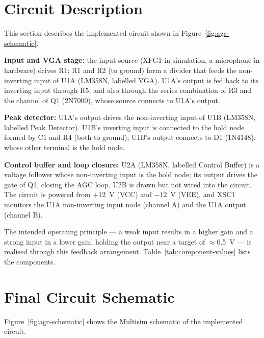 \section{Circuit Description}
\label{sec:circuit-description}

This section describes the implemented circuit shown in Figure~\ref{fig:agc-schematic}.

\textbf{Input and VGA stage:} the input source (XFG1 in simulation, a microphone in hardware) drives R1; R1 and R2 (to ground) form a divider that feeds the non-inverting input of U1A (LM358N, labelled VGA). U1A's output is fed back to its inverting input through R5, and also through the series combination of R3 and the channel of Q1 (2N7000), whose source connects to U1A's output.

\textbf{Peak detector:} U1A's output drives the non-inverting input of U1B (LM358N, labelled Peak Detector). U1B's inverting input is connected to the hold node formed by C1 and R4 (both to ground); U1B's output connects to D1 (1N4148), whose other terminal is the hold node.

\textbf{Control buffer and loop closure:} U2A (LM358N, labelled Control Buffer) is a voltage follower whose non-inverting input is the hold node; its output drives the gate of Q1, closing the AGC loop. U2B is drawn but not wired into the circuit. The circuit is powered from $+12$~V (VCC) and $-12$~V (VEE), and XSC1 monitors the U1A non-inverting input node (channel A) and the U1A output (channel B).

The intended operating principle --- a weak input results in a higher gain and a strong input in a lower gain, holding the output near a target of $\approx$0.5~V --- is realised through this feedback arrangement. Table~\ref{tab:component-values} lists the components.


\section{Final Circuit Schematic}

Figure~\ref{fig:agc-schematic} shows the Multisim schematic of the implemented circuit.

